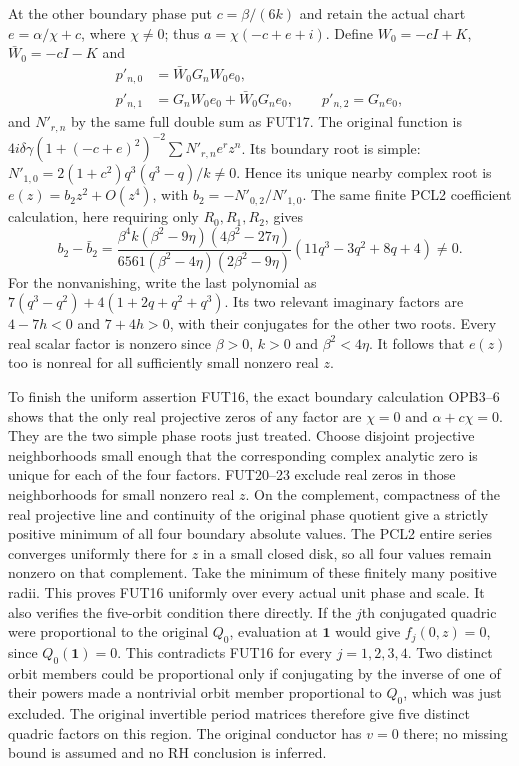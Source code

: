 At the other boundary phase put $c=\beta/(6k)$ and retain the actual
chart $e=\alpha/\chi+c$, where $\chi\ne0$; thus
$a=\chi(-c+e+i)$. Define $W_0=-cI+K$, $\bar W_0=-cI-K$ and
\[
 \begin{split}
 p'_{n,0}&=\bar W_0G_nW_0e_0,\\
 p'_{n,1}&=G_nW_0e_0+\bar W_0G_ne_0,\qquad
 p'_{n,2}=G_ne_0,
 \end{split}\tag{FUT22}
\]
and $N'_{r,n}$ by the same full double sum as FUT17.
The original function is
$4i\delta\gamma(1+(-c+e)^2)^{-2}\sum N'_{r,n}e^rz^n$.
Its boundary root is simple:
$N'_{1,0}=2(1+c^2)q^3(q^3-q)/k\ne0$.
Hence its unique nearby complex root is
$e(z)=b_2z^2+O(z^4)$, with $b_2=-N'_{0,2}/N'_{1,0}$.
The same finite PCL2 coefficient calculation, here requiring only
$R_0,R_1,R_2$, gives
\[
 b_2-\bar b_2=
 \frac{\beta^4k(\beta^2-9\eta)(4\beta^2-27\eta)}
      {6561(\beta^2-4\eta)(2\beta^2-9\eta)}
       (11q^3-3q^2+8q+4)\ne0.
 \tag{FUT23}
\]
For the nonvanishing, write the last polynomial as
$7(q^3-q^2)+4(1+2q+q^2+q^3)$.
Its two relevant imaginary factors are $4-7h<0$ and $7+4h>0$,
with their conjugates for the other two roots. Every real scalar
factor is nonzero since $\beta>0$, $k>0$ and $\beta^2<4\eta$.
It follows that $e(z)$ too is nonreal for all sufficiently small
nonzero real $z$.

To finish the uniform assertion FUT16, the exact boundary calculation
OPB3--6 shows that the only real projective zeros of any factor are
$\chi=0$ and $\alpha+c\chi=0$. They are the two simple phase roots
just treated. Choose disjoint projective neighborhoods small enough
that the corresponding complex analytic zero is unique for each of
the four factors. FUT20--23 exclude real zeros in those neighborhoods
for small nonzero real $z$. On the complement, compactness of the
real projective line and continuity of the original phase quotient
give a strictly positive minimum of all four boundary absolute values.
The PCL2 entire series converges uniformly there for $z$ in a small
closed disk, so all four values remain nonzero on that complement.
Take the minimum of these finitely many positive radii.
This proves FUT16 uniformly over every actual unit phase and scale.
It also verifies the five-orbit condition there directly. If the
$j$th conjugated quadric were proportional to the original $Q_0$,
evaluation at $\boldsymbol1$ would give $f_j(0,z)=0$, since
$Q_0(\boldsymbol1)=0$. This contradicts FUT16 for every $j=1,2,3,4$.
Two distinct orbit members could be proportional only if conjugating
by the inverse of one of their powers made a nontrivial orbit member
proportional to $Q_0$, which was just excluded. The original invertible
period matrices therefore give five distinct quadric factors on this
region. The original conductor has $v=0$ there; no missing bound is
assumed and no RH conclusion is inferred.

